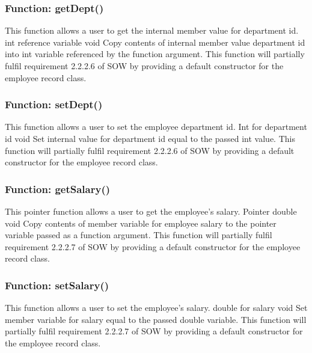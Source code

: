 \documentclass[12pt]{article}%
\newcounter{subsubsubsection}[subsubsection]
\begin{document}
\subsubsection{Function:  getDept()}
This function allows a user to get the internal member value for department id.
int reference variable
void
Copy contents of internal member value department id into int variable referenced by the function argument.
This function will partially fulfil requirement 2.2.2.6 of SOW by providing a default constructor for the
employee record class.

\subsubsection{Function:  setDept()}
This function allows a user to set the employee department id.
Int for department id
void
Set internal value for department id equal to the passed int value.
This function will partially fulfil requirement 2.2.2.6 of SOW by providing a default constructor for the
employee record class.

\subsubsection{Function:  getSalary()}
This pointer function allows a user to get the employee's salary.
Pointer double
void
Copy contents of member variable for employee salary to the pointer variable passed as a function argument.
This function will partially fulfil requirement 2.2.2.7 of SOW by providing a default constructor for the
employee record class.

\subsubsection{Function:  setSalary()}
This function allows a user to set the employee's salary.
double for salary
void
Set member variable for salary equal to the passed double variable.
This function will partially fulfil requirement 2.2.2.7 of SOW by providing a default constructor for the
employee record class.
\end{document}
